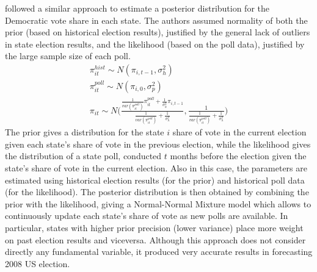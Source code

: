 \documentclass[
  12pt]{article}
\begin{document}
\citep{loc:gel:2010} followed a similar approach to estimate a posterior
distribution for the Democratic vote share in each state. The authors
assumed normality of both the prior (based on historical election
results), justified by the general lack of outliers in state election
results, and the likelihood (based on the poll data), justified by the
large sample size of each poll. \[
\begin{aligned}
\pi_{it}^{hist} \sim N(\pi_{i,t-1}, \sigma^2_{h}) \;\;\;\;\;\;\;\;\;\;\;\;\;\;\;\;\;\;\;\;\;\; \\
\pi_{it}^{poll} \sim N(\pi_{i,0}, \sigma^2_{p}) \;\;\;\;\;\;\;\;\;\;\;\;\;\;\;\;\;\;\;\;\;\;\;\; \\
\pi_{it} \sim N\biggl(\frac{\frac{1}{var(\pi^{poll}_{it})}\pi^{poll}_{it} + \frac{1}{\sigma^2_{h}}\pi_{i,t-1}}{\frac{1}{var(\pi^{poll}_{it})} + \frac{1}{\sigma^2_{h}}}, \frac{1}{\frac{1}{var(\pi^{poll}_{it})} + \frac{1}{\sigma^2_{h}}} \biggr)
\end{aligned}
\] The prior gives a distribution for the state \(i\) share of vote in
the current election given each state's share of vote in the previous
election, while the likelihood gives the distribution of a state poll,
conducted \(t\) months before the election given the state's share of
vote in the current election. Also in this case, the parameters are
estimated using historical election results (for the prior) and
historical poll data (for the likelihood). The posterior distribution is
then obtained by combining the prior with the likelihood, giving a
Normal-Normal Mixture model which allows to continuously update each
state's share of vote as new polls are available. In particular, states
with higher prior precision (lower variance) place more weight on past
election results and viceversa. Although this approach does not consider
directly any fundamental variable, it produced very accurate results in
forecasting 2008 US election.
\end{document}
